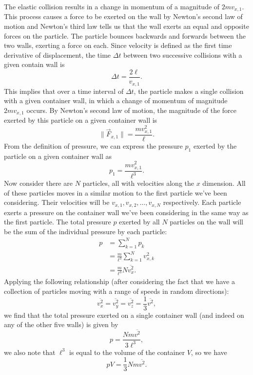The elastic collision results in a change in momentum of a magnitude of $2 m v_{x, 1}$. This process causes a force to be exerted on the wall by Newton's second law of motion and Newton's third law tells us that the wall exerts an equal and opposite forces on the particle. The particle bounces backwards and forwards between the two walls, exerting a force on each. Since velocity is defined as the first time derivative of displacement, the time $\Delta t$ between two successive collisions with a given contain wall is
\begin{equation*}
    \Delta t = \frac{2 \ell}{v_{x, 1}}.
\end{equation*}
This implies that over a time interval of $\Delta t$, the particle makes a single collision with a given container wall, in which a change of momentum of magnitude $2mv_{x, 1}$ occurs. By Newton's second law of motion, the magnitude of the force exerted by this particle on a given container wall is 
\begin{equation*}
    \| \vec{F}_{x, 1} \| = \frac{m v_{x,1}^2}{\ell}.
\end{equation*}
From the definition of pressure, we can express the pressure $p_1$ exerted by the particle on a given container wall as
\begin{equation*}
    p_1 = \frac{m v_{x,1}^2}{\ell^3}. 
\end{equation*}
Now consider there are $N$ particles, all with velocities along the $x$ dimension. All of these particles moves in a similar motion to the first particle we've been considering. Their velocities will be $v_{x, 1}, v_{x, 2}, \ldots, v_{x, N}$ respectively. Each particle exerts a pressure on the container wall we've been considering in the same way as the first particle. The total pressure $p$ exerted by all $N$ particles on the wall will be the sum of the individual pressure by each particle: 
\begin{align*}
    p &= \sum_{k=1}^N p_k \\
    &= \frac{m}{\ell^3} \sum_{k=1}^N v_{x, k}^2 \\
    &= \frac{m}{\ell^3} N \overline{v_x^2}.
\end{align*}
Applying the following relationship (after considering the fact that we have a collection of particles moving with a range of speeds in random directions):
\begin{equation*}
    \overline{v_x^2} = \overline{v_y^2} = \overline{v_z^2} = \frac{1}{3} \overline{v^2},
\end{equation*}
we find that the total pressure exerted on a single container wall (and indeed on any of the other five walls) is given by
\begin{equation*}
    p = \frac{Nm\overline{v^2}}{3 \ell^3},
\end{equation*}
we also note that $\ell^3$ is equal to the volume of the container $V$, so we have
\begin{equation}
    pV = \frac{1}{3} Nm\overline{v^2}.
\end{equation}

